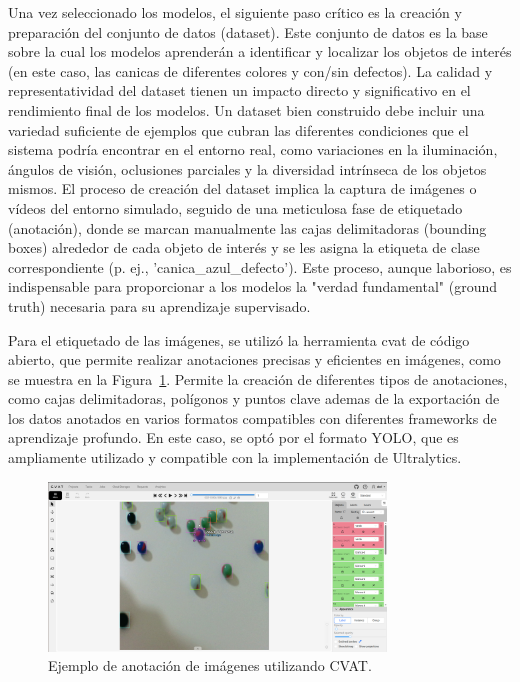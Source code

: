 \documentclass[11pt,spanish,listoffigures,listoftables]{tfgetsinf}
\begin{document}
Una vez seleccionado los modelos, el siguiente paso crítico es la creación y preparación del conjunto de datos (dataset). Este conjunto de datos es la base sobre la cual los modelos aprenderán a identificar y localizar los objetos de interés (en este caso, las canicas de diferentes colores y con/sin defectos). La calidad y representatividad del dataset tienen un impacto directo y significativo en el rendimiento final de los modelos. Un dataset bien construido debe incluir una variedad suficiente de ejemplos que cubran las diferentes condiciones que el sistema podría encontrar en el entorno real, como variaciones en la iluminación, ángulos de visión, oclusiones parciales y la diversidad intrínseca de los objetos mismos. El proceso de creación del dataset implica la captura de imágenes o vídeos del entorno simulado, seguido de una meticulosa fase de etiquetado (anotación), donde se marcan manualmente las cajas delimitadoras (bounding boxes) alrededor de cada objeto de interés y se les asigna la etiqueta de clase correspondiente (p. ej., 'canica\_azul\_defecto'). Este proceso, aunque laborioso, es indispensable para proporcionar a los modelos la "verdad fundamental" (ground truth) necesaria para su aprendizaje supervisado.

Para el etiquetado de las imágenes, se utilizó la herramienta \gls{cvat}\cite{CVAT_ai_Corporation_Computer_Vision_Annotation_2023} de código abierto, que permite realizar anotaciones precisas y eficientes en imágenes, como se muestra en la Figura~\ref{fig:cvat_anotacion}. Permite la creación de diferentes tipos de anotaciones, como cajas delimitadoras, polígonos y puntos clave ademas de la exportación de los datos anotados en varios formatos compatibles con diferentes frameworks de aprendizaje profundo. En este caso, se optó por el formato YOLO, que es ampliamente utilizado y compatible con la implementación de Ultralytics.

\begin{figure}[H]
   \centering
   \includegraphics[width=0.8\textwidth]{images/diseno_e_implementacion/ejemplo_CVAT.png}
   \caption[Ejemplo de anotación de imágenes utilizando CVAT]{Ejemplo de anotación de imágenes utilizando CVAT.}
   \label{fig:cvat_anotacion}
\end{figure}
\end{document}
